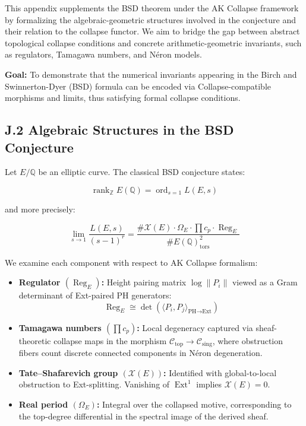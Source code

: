 \documentclass[11pt]{article}
\DeclareMathOperator{\Ext}{Ext}
\newcommand{\Sha}{\mathcal{X}}
\begin{document}
This appendix supplements the BSD theorem under the AK Collapse framework by formalizing the algebraic-geometric structures involved in the conjecture and their relation to the collapse functor. We aim to bridge the gap between abstract topological collapse conditions and concrete arithmetic-geometric invariants, such as regulators, Tamagawa numbers, and Néron models.

\begin{center}
\textbf{Goal:} To demonstrate that the numerical invariants appearing in the Birch and Swinnerton-Dyer (BSD) formula can be encoded via Collapse-compatible morphisms and limits, thus satisfying formal collapse conditions.
\end{center}

\subsection*{J.2 Algebraic Structures in the BSD Conjecture}

Let $E/\mathbb{Q}$ be an elliptic curve. The classical BSD conjecture states:

\[
\operatorname{rank}_{\mathbb{Z}} E(\mathbb{Q}) = \operatorname{ord}_{s=1} L(E,s)
\]

and more precisely:

\[
\lim_{s \to 1} \frac{L(E,s)}{(s-1)^r} = \frac{\#\Sha(E)\cdot \Omega_E \cdot \prod c_p \cdot \operatorname{Reg}_E}{\# E(\mathbb{Q})_\text{tors}^2}
\]

We examine each component with respect to AK Collapse formalism:

\begin{itemize}
  \item \textbf{Regulator $(\operatorname{Reg}_E)$:} Height pairing matrix $\log \|P_i\|$ viewed as a Gram determinant of Ext-paired PH generators:
  \[
  \operatorname{Reg}_E \cong \det\left( \langle P_i, P_j \rangle_{\text{PH} \to \text{Ext}} \right)
  \]
  \item \textbf{Tamagawa numbers $(\prod c_p)$:} Local degeneracy captured via sheaf-theoretic collapse maps in the morphism $\mathcal{C}_{\mathrm{top}} \to \mathcal{C}_{\mathrm{sing}}$, where obstruction fibers count discrete connected components in Néron degeneration.
  \item \textbf{Tate--Shafarevich group $(\Sha(E))$:} Identified with global-to-local obstruction to Ext-splitting. Vanishing of $\Ext^1$ implies $\Sha(E) = 0$.
  \item \textbf{Real period $(\Omega_E)$:} Integral over the collapsed motive, corresponding to the top-degree differential in the spectral image of the derived sheaf.
\end{itemize}
\end{document}
